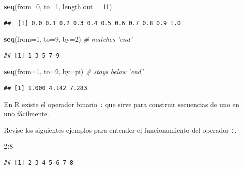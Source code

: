 \documentclass[10pt,]{krantz}
\makeatletter
\newenvironment{Shaded}{\begin{snugshade}}{\end{snugshade}}
\newcommand{\KeywordTok}[1]{\textcolor[rgb]{0.13,0.29,0.53}{\textbf{#1}}}
\newcommand{\DataTypeTok}[1]{\textcolor[rgb]{0.13,0.29,0.53}{#1}}
\newcommand{\DecValTok}[1]{\textcolor[rgb]{0.00,0.00,0.81}{#1}}
\newcommand{\CommentTok}[1]{\textcolor[rgb]{0.56,0.35,0.01}{\textit{#1}}}
\newcommand{\OperatorTok}[1]{\textcolor[rgb]{0.81,0.36,0.00}{\textbf{#1}}}
\newcommand{\NormalTok}[1]{#1}
\newenvironment{kframe}{%
\medskip{}
\setlength{\fboxsep}{.8em}
 \def\at@end@of@kframe{}%
 \ifinner\ifhmode%
  \def\at@end@of@kframe{\end{minipage}}%
  \begin{minipage}{\columnwidth}%
 \fi\fi%
 \def\FrameCommand##1{\hskip\@totalleftmargin \hskip-\fboxsep
 \colorbox{shadecolor}{##1}\hskip-\fboxsep
     \hskip-\linewidth \hskip-\@totalleftmargin \hskip\columnwidth}%
 \MakeFramed {\advance\hsize-\width
   \@totalleftmargin\z@ \linewidth\hsize
   \@setminipage}}%
 {\par\unskip\endMakeFramed%
 \at@end@of@kframe}
\renewenvironment{Shaded}{\begin{kframe}}{\end{kframe}}
\let\BeginKnitrBlock\begin \let\EndKnitrBlock\end
\makeatother
\begin{document}
\begin{Shaded}
\begin{Highlighting}[]
\KeywordTok{seq}\NormalTok{(}\DataTypeTok{from=}\DecValTok{0}\NormalTok{, }\DataTypeTok{to=}\DecValTok{1}\NormalTok{, }\DataTypeTok{length.out =} \DecValTok{11}\NormalTok{)}
\end{Highlighting}
\end{Shaded}

\begin{verbatim}
##  [1] 0.0 0.1 0.2 0.3 0.4 0.5 0.6 0.7 0.8 0.9 1.0
\end{verbatim}

\begin{Shaded}
\begin{Highlighting}[]
\KeywordTok{seq}\NormalTok{(}\DataTypeTok{from=}\DecValTok{1}\NormalTok{, }\DataTypeTok{to=}\DecValTok{9}\NormalTok{, }\DataTypeTok{by=}\DecValTok{2}\NormalTok{)  }\CommentTok{# matches 'end'}
\end{Highlighting}
\end{Shaded}

\begin{verbatim}
## [1] 1 3 5 7 9
\end{verbatim}

\begin{Shaded}
\begin{Highlighting}[]
\KeywordTok{seq}\NormalTok{(}\DataTypeTok{from=}\DecValTok{1}\NormalTok{, }\DataTypeTok{to=}\DecValTok{9}\NormalTok{, }\DataTypeTok{by=}\NormalTok{pi) }\CommentTok{# stays below 'end'}
\end{Highlighting}
\end{Shaded}

\begin{verbatim}
## [1] 1.000 4.142 7.283
\end{verbatim}

\BeginKnitrBlock{rmdnote}
En R existe el operador binario \texttt{:} que sirve para construir
secuencias de uno en uno fácilmente.
\EndKnitrBlock{rmdnote}

Revise los siguientes ejemplos para entender el funcionamiento del
operador \texttt{:}.

\begin{Shaded}
\begin{Highlighting}[]
\DecValTok{2}\OperatorTok{:}\DecValTok{8}
\end{Highlighting}
\end{Shaded}

\begin{verbatim}
## [1] 2 3 4 5 6 7 8
\end{verbatim}
\end{document}

